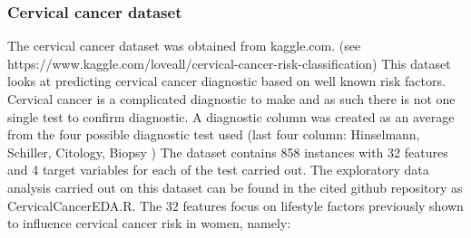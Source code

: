\subsubsection{Cervical cancer dataset}
The cervical cancer dataset was obtained from kaggle.com. \newline
(see https://www.kaggle.com/loveall/cervical-cancer-risk-classification)\newline
This dataset looks at predicting cervical cancer diagnostic based on well known risk factors. Cervical cancer is a complicated diagnostic to make and as such there is not one single test to confirm diagnostic. A diagnostic column was created as an average from the four possible diagnostic test used  (last four column: Hinselmann, Schiller, Citology, Biopsy ) \cite{Fernandes:2017td} %
The dataset contains 858 instances with 32 features and 4 target variables for each of the test carried out.
The exploratory data analysis carried out on this dataset can be found in the cited github repository as CervicalCancerEDA.R.
The 32 features focus on lifestyle factors previously shown to influence cervical cancer risk in women, namely:
